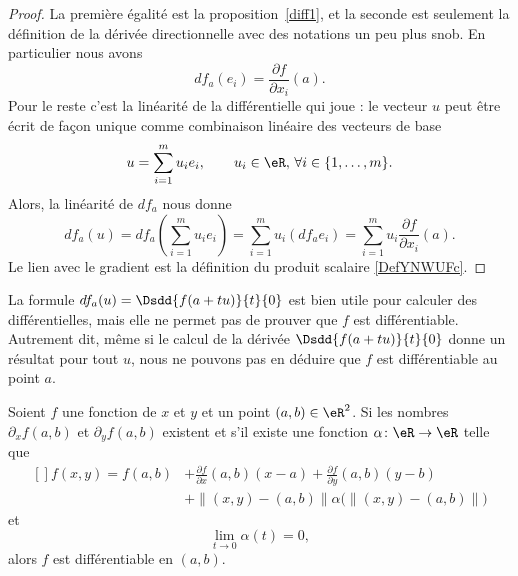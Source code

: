 \begin{proof}
La première égalité est la proposition~\ref{diff1}, et la seconde est seulement la définition de la dérivée directionnelle avec des notations un peu plus snob. En particulier nous avons
\begin{equation}
    df_a(e_i)=\frac{ \partial f }{ \partial x_i }(a).
\end{equation}
Pour le reste c'est la linéarité de la différentielle qui joue : le vecteur $u$ peut être écrit de façon unique comme combinaison linéaire des vecteurs de base
\[
u=\sum_{i=1}^{m}u_i e_i, \qquad  u_i\in\eR,\, \forall i\in\{1,\ldots, m\}.
\]
Alors, la linéarité de $df_a$ nous donne
\begin{equation}
     df_a(u)= df_a\left(\sum_{i=1}^{m}u_i e_i\right)
=\sum_{i=1}^{m}u_i \left(df_ae_i\right)
=\sum_{i=1}^{m}u_i \frac{ \partial f }{ \partial x_i }(a).
 \end{equation}
Le lien avec le gradient est la définition du produit scalaire \eqref{DefYNWUFc}.
\end{proof}

La formule $df_a(u)=\Dsdd{ f(a+tu) }{t}{0}$ est bien utile pour calculer des différentielles, mais elle ne permet pas de prouver que \( f\) est différentiable. Autrement dit, même si le calcul de la dérivée \( \Dsdd{ f(a+tu) }{t}{0}\) donne un résultat pour tout \( u\), nous ne pouvons pas en déduire que \( f\) est différentiable au point \( a\).


\begin{proposition} \label{PropExistDiffUn}
    Soient $f$ une fonction de $x$ et $y$ et un point $(a,b)\in\eR^2$. Si les nombres $\partial_xf(a,b)$ et $\partial_yf(a,b)$ existent et s'il existe une fonction $\alpha\colon \eR\to \eR$ telle que
    \begin{equation}        \label{eqCritDifffabsrt}
        \begin{aligned}[]
            f(x,y)=f(a,b)&+\frac{ \partial f }{ \partial x }(a,b)(x-a)+\frac{ \partial f }{ \partial y }(a,b)(y-b)\\
            &+\| (x,y)-(a,b) \| \alpha\Big( \| (x,y)-(a,b) \| \Big)
        \end{aligned}
    \end{equation}
    et
    \begin{equation}
        \lim_{t\to 0} \alpha(t)=0,
    \end{equation}
    alors $f$ est différentiable en $(a,b)$.
\end{proposition}


